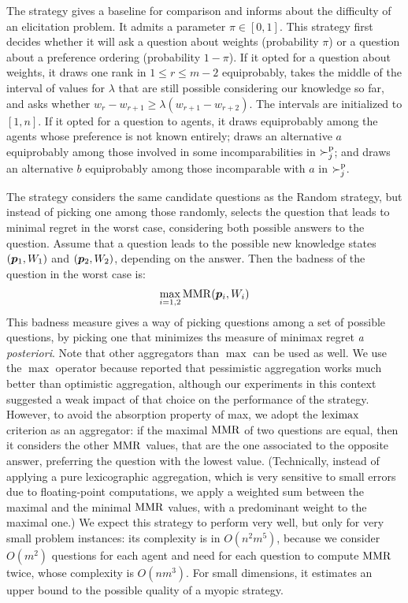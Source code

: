 \documentclass[sigconf, anonymous]{aamas}
\begin{document}
The  strategy gives a baseline for comparison and informs about the difficulty of an elicitation problem. 
It admits a parameter $\pi \in [0, 1]$.
This strategy first decides whether it will ask a question about weights (probability $\pi$) or a question about a preference ordering (probability $1-\pi$). If it opted for a question about weights, it draws one rank in $1 ≤ r ≤ m-2$ equiprobably, takes the middle of the interval of values for $\lambda$ that are still possible considering our knowledge so far, and asks whether $w_r - w_{r+1} ≥ \lambda (w_{r+1} - w_{r+2})$. The intervals are initialized to $[1, n]$. If it opted for a question to agents, it draws equiprobably among the agents whose preference is not known entirely; draws an alternative $a$ equiprobably among those involved in some incomparabilities in $\succ^\text{p}_j$; and draws an alternative $b$ equiprobably among those incomparable with $a$ in $\succ^\text{p}_j$.

The  strategy considers the same candidate questions as the Random strategy, but instead of picking one among those randomly, selects the question that leads to minimal regret in the worst case, considering both possible answers to the question. Assume that a question leads to the possible new knowledge states $({\bm{p}}_1, W_1)$ and $({\bm{p}}_2, W_2)$, depending on the answer. Then the badness of the question in the worst case is:
\begin{align}
	\max_{i=1,2} \operatorname{MMR}({\bm{p}}_i,W_i)
\end{align}
This badness measure gives a way of picking questions among a set of possible questions, by picking one that minimizes ths measure of minimax regret {\em a posteriori}. 
Note that other aggregators than $\max$ can be used as well. 
We use the $\max$ operator because \citet{Cailloux2014} reported that pessimistic aggregation works much better than optimistic aggregation, although our experiments in this context suggested a weak impact of that choice on the performance of the strategy.
However, to avoid the absorption property of max, we adopt the $\operatorname{leximax}$ criterion as an aggregator: if the maximal $\operatorname{MMR}$ of two questions are equal, then it considers the other $\operatorname{MMR}$ values, that are the one associated to the opposite answer, preferring the question with the lowest value.
(Technically, instead of applying a pure lexicographic aggregation, which is very sensitive to small errors due to floating-point computations, we apply a weighted sum between the maximal and the minimal $\operatorname{MMR}$ values, with a predominant weight to the maximal one.)
We expect this strategy to perform very well, but only for very small problem instances: its complexity is in $O(n^2 m^5)$, because we consider $O(m^2)$ questions for each agent and need for each question to compute $\operatorname{MMR}$ twice, whose complexity is $O(nm^3)$. For small dimensions, it estimates an upper bound to the possible quality of a myopic strategy.
\end{document}
